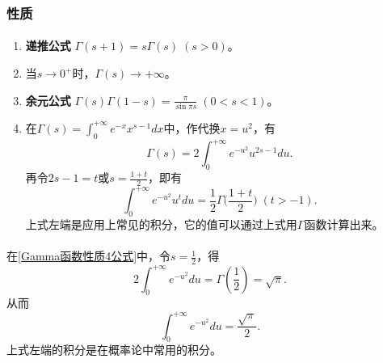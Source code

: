 \subsubsection{性质}
\paragraph{}

\begin{enumerate}
  \item \textbf{递推公式\;} $\Gamma(s+1)=s\Gamma(s) \; (s > 0)$。
  \item 当$s\to 0^+$时，$\Gamma(s) \to +\infty$。
  \item \textbf{余元公式\;} $\displaystyle\Gamma(s)\Gamma(1-s)=\frac{\pi}{\sin\pi s} \; (0 < s < 1)$。
  \item 在$\displaystyle\Gamma(s) = \int_0^{+\infty}e^{-x}x^{s-1}dx$中，作代换$x=u^2$，有
  \begin{equation}
    \label{Gamma函数性质4公式}
    \Gamma(s) = 2\int_0^{+\infty}e^{-u^2}u^{2s-1}du.
  \end{equation}
  再令$2s-1=t$或$\displaystyle s=\frac{1+t}{2}$，即有
  \begin{equation}
    \int_0^{+\infty}e^{-u^2}u^tdu = \frac{1}{2}\Gamma\big( \frac{1+t}{2} \big) \; (t > -1).
  \end{equation}
  上式左端是应用上常见的积分，它的值可以通过上式用$\Gamma$函数计算出来。
\end{enumerate}

\paragraph{}
在\eqref{Gamma函数性质4公式}中，令$\displaystyle s=\frac{1}{2}$，得
\begin{equation}
  2\int_0^{+\infty}e^{-u^2}du = \Gamma(\frac{1}{2}) = \sqrt{\pi}.
\end{equation}
从而
\begin{equation}
  \int_0^{+\infty}e^{-u^2}du=\frac{\sqrt{\pi}}{2}.
\end{equation}
上式左端的积分是在概率论中常用的积分。
